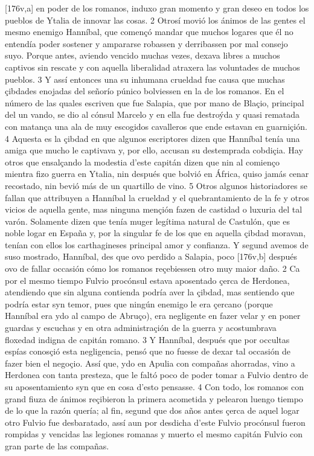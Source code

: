 \documentclass[11pt,twoside]{article}\makeatletter
\def\persName{}\def\name{}
\def\placeName{}
\begin{document}
[176v,a] en poder de los romanos, induxo gran momento y gran deseo en todos los pueblos de Ytalia de innovar las cosas. 2 Otrosí movió los ánimos de las gentes el mesmo enemigo  {\persName Hanníbal}, que començó mandar que muchos logares que él no entendía poder sostener y ampararse robassen y derribassen por mal consejo suyo. Porque antes, aviendo vencido muchas vezes, dexava libres a muchos captivos sin rescate y con aquella liberalidad atraxera las voluntades de muchos pueblos. 3 Y assí entonces una su inhumana crueldad fue causa que muchas çibdades enojadas del señorío púnico bolviessen en la de los romanos. En el número de las quales escriven que fue Salapia, que por mano de Blaçio, principal del un vando, se dio al cónsul Marcelo y en ella fue destroýda y quasi rematada con matança una ala de muy escogidos cavalleros que ende estavan en guarniçión. 4 Aquesta es la çibdad en que algunos escriptores dizen que  {\persName Hanníbal} tenía una amiga que mucho le captivava y, por ello, accusan su destemprada cobdiçia. Hay otros que ensalçando la modestia d’este capitán dizen que nin al comienço mientra fizo guerra en Ytalia, nin después que bolvió en  {\placeName África}, quiso jamás cenar recostado, nin bevió más de un quartillo de vino. 5 Otros algunos historiadores se fallan que attribuyen a  {\persName Hanníbal} la crueldad y el quebrantamiento de la fe y otros vicios de aquella gente, mas ninguna mençión fazen de castidad o luxuria del tal varón. Solamente dizen que tenía muger legítima natural de Castulón, que es noble logar en  {\placeName España} y, por la singular fe de los que en aquella çibdad moravan, tenían con ellos los  {\name carthagineses} principal amor y confianza.
\pend
{} Y segund avemos de suso mostrado,  {\persName Hanníbal}, des que ovo perdido a Salapia, poco %
[176v,b] después ovo de fallar occasión cómo los romanos reçebiessen otro muy maior daño. 2 Ca por el mesmo tiempo Fulvio procónsul estava aposentado çerca de Herdonea, atendiendo que sin alguna contienda podría aver la çibdad, mas sentiendo que podría estar syn temor, pues que ningún enemigo le era çercano (porque  {\persName Hanníbal} era ydo al campo de Abruço), era negligente en fazer velar y en poner guardas y escuchas y en  otra administraçión de la guerra y acostumbrava floxedad indigna de capitán romano. 3 Y  {\persName Hanníbal}, después que por occultas espías conosçió esta negligencia, pensó que no fuesse de dexar tal occasión de fazer bien el negoçio. Assí que, ydo en Apulia con compañas ahorradas, vino a Herdonea con tanta presteza, que le faltó poco de poder tomar a Fulvio dentro de su aposentamiento syn que en cosa d’esto pensasse. 4 Con todo, los romanos con grand fiuza de ánimos reçibieron la primera acometida y pelearon luengo tiempo de lo que la razón quería; al fin, segund que dos años antes çerca de aquel logar otro Fulvio fue desbaratado, assí aun por desdicha d’este Fulvio procónsul fueron rompidas y vencidas las legiones romanas y muerto el mesmo capitán Fulvio con gran parte de las compañas.
\end{document}
